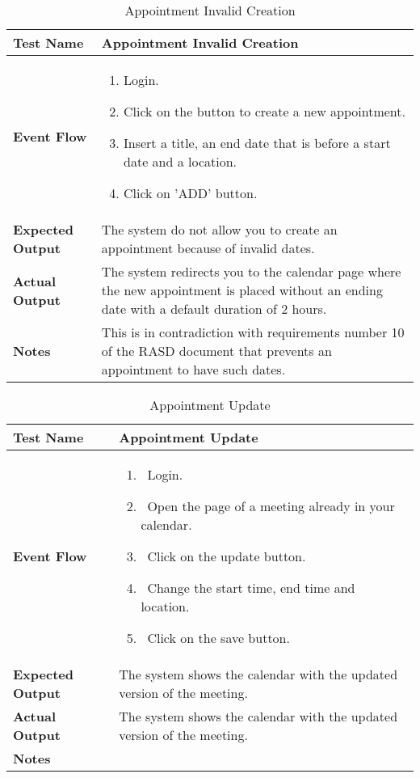 \begin{table}[h]	
	\centering
	\def\arraystretch{1.5}
	\begin{tabular}{|m{7cm}|m{7cm}|}
		\hline
		\textbf{Test Name}            & Appointment Invalid Creation   \\ \hline
		\textbf{Event Flow}             & 
		\begin{enumerate}
			\item Login.
			\item Click on the button to create a new appointment.
			\item Insert a title, an end date that is before a start date and a location.
			\item Click on 'ADD' button.
		\end{enumerate} \\ \hline
		\textbf{Expected Output}  &  The system do not allow you to create an appointment because of invalid dates.   \\ \hline
		\textbf{Actual Output}       & The system redirects you to the calendar page where the new appointment is placed without an ending date with a default duration of 2 hours.    \\ \hline
		\textbf{Notes} & This is in contradiction with requirements number 10 of the RASD document that prevents an appointment to have such dates. \\ \hline
	\end{tabular}
	\caption{Appointment Invalid Creation}
\end{table}


\begin{table}[h]	
\centering
\def\arraystretch{1.5}
\begin{tabular}{|m{7cm}|m{7cm}|}
	\hline
	\textbf{Test Name}            &  Appointment Update  \\ \hline
	\textbf{Event Flow}             & 
		\begin{enumerate}
			\item~Login.
			\item~Open the page of a meeting already in your calendar.
			\item~Click on the update button.
			\item~Change the start time, end time and location.
			\item~Click on the save button.
		\end{enumerate}
	\\ \hline
	\textbf{Expected Output}  &  The system shows the calendar with the updated version of the meeting.   \\ \hline
	\textbf{Actual Output}       &  The system shows the calendar with the updated version of the meeting.   \\ \hline
	\textbf{Notes} & \\ \hline
\end{tabular}
\caption{Appointment Update}
\end{table}


